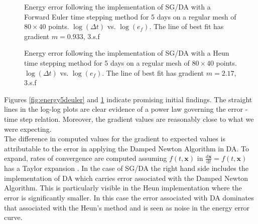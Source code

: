 \begin{figure}[ht]
	\centering
	\caption[Energy Error from implementation of SG/DA via Forward Euler timestepping method for 5 days]{Energy error following the implementation of SG/DA with a Forward Euler time stepping method for 5 days on a regular mesh of $80 \times 40$ points. $\log(\Delta t)$ vs. $\log(e_f)$. The line of best fit has gradient $m = 0.933$, 3.s.f} \label{fig:energy5deuler}
	\caption[Energy Error from implementation of SG/DA via Heun timestepping method for 5 days]{ Energy error following the implementation of SG/DA with a Heun time stepping method for 5 days on a regular mesh of $80 \times 40$ points. $\log(\Delta t)$ vs. $\log(e_f)$. The line of best fit has gradient $m = 2.17$, 3.s.f}
	\label{fig:energy5dheun}
\end{figure}
Figures \ref{fig:energy5deuler} and \ref{fig:energy5dheun} indicate promising initial findings. The straight lines in the log-log plots are clear evidence of a power law governing the error - time step relation. Moreover, the gradient values are reasonably close to what we were expecting.\\
\linebreak
The difference in computed values for the gradient to expected values is attributable to the error in applying the Damped Newton Algorithm in DA. To expand, rates of convergence are computed assuming $f(t,\bm{x})$ in $\frac{\textrm{d}\bm{x}}{\textrm{d}t} = f(t,\bm{x})$ has a Taylor expansion \cite{Griffiths2010}. In the case of SG/DA the right hand side includes the implementation of DA which carries error associated with the Damped Newton Algorithm. This is particularly visible in the Heun implementation where the error is significantly smaller. In this case the error associated with DA dominates that associated with the Heun's method and is seen as noise in the energy error curve.\\
